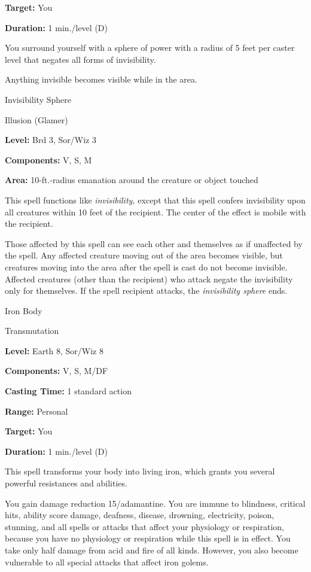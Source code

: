 \documentclass{article}
\begin{document}
\textbf{Target:} You

\textbf{Duration:} 1 min./level (D)

You surround yourself with a sphere of power with a radius of 5 feet per caster 
level that negates all forms of invisibility.

Anything invisible becomes visible while in the area.

\vspace{12pt}
Invisibility Sphere

Illusion (Glamer)

\textbf{Level:} Brd 3, Sor/Wiz 3

\textbf{Components:} V, S, M

\textbf{Area:} 10-ft.-radius emanation around the creature or object touched

This spell functions like \textit{invisibility, }except that this spell confers 
invisibility upon all creatures within 10 feet of the recipient. The center of 
the effect is mobile with the recipient.

Those affected by this spell can see each other and themselves as if unaffected 
by the spell. Any affected creature moving out of the area becomes visible, but 
creatures moving into the area after the spell is cast do not become invisible. 
Affected creatures (other than the recipient) who attack negate the invisibility 
only for themselves. If the spell recipient attacks, the \textit{invisibility sphere 
}ends.

\vspace{12pt}
Iron Body

Transmutation

\textbf{Level:} Earth 8, Sor/Wiz 8

\textbf{Components:} V, S, M/DF

\textbf{Casting Time:} 1 standard action

\textbf{Range:} Personal

\textbf{Target:} You

\textbf{Duration:} 1 min./level (D)

This spell transforms your body into living iron, which grants you several powerful 
resistances and abilities.

You gain damage reduction 15/adamantine. You are immune to blindness, critical 
hits, ability score damage, deafness, disease, drowning, electricity, poison, stunning, 
and all spells or attacks that affect your physiology or respiration, because you 
have no physiology or respiration while this spell is in effect. You take only 
half damage from acid and fire of all kinds. However, you also become vulnerable 
to all special attacks that affect iron golems.
\end{document}
